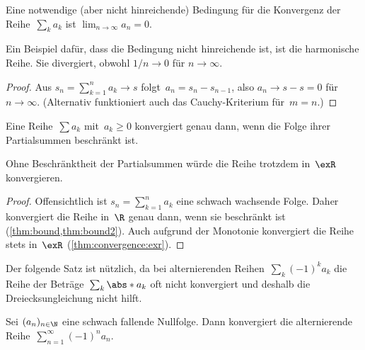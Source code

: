 \documentclass[a4paper]{article}
\begin{document}

\begin{theorem}\label{thm:series:zerosequence}
    Eine notwendige (aber nicht hinreichende) Bedingung für die Konvergenz der Reihe~$\sum_k a_k$ ist $\lim_{n\to\infty} a_n = 0$.
\end{theorem}

\begin{example}
    Ein Beispiel dafür, dass die Bedingung nicht hinreichende ist, ist die harmonische Reihe. Sie divergiert, obwohl $1/n \to 0$ für $n \to \infty$.
\end{example}

\begin{proof}
    Aus $s_n = \sum_{k=1}^n a_k \to s$ folgt~$a_n = s_n - s_{n-1}$, also $a_n \to s-s = 0$ für~$n \to \infty$. (Alternativ funktioniert auch das Cauchy-Kriterium für~$m = n$.)
\end{proof}

\begin{theorem}
    Eine Reihe~$\sum a_k$ mit~$a_k \geq 0$ konvergiert genau dann, wenn die Folge ihrer Partialsummen beschränkt ist.
\end{theorem}

\begin{remark}
    Ohne Beschränktheit der Partialsummen würde die Reihe trotzdem in~$\exR$ konvergieren.
\end{remark}

\begin{proof}
    Offensichtlich ist $s_n = \sum_{k=1}^n a_k$ eine schwach wachsende Folge. Daher konvergiert die Reihe in~$\R$ genau dann, wenn sie beschränkt ist (\cref{thm:bound,thm:bound2}). Auch aufgrund der Monotonie konvergiert die Reihe stets in~$\exR$ (\cref{thm:convergence:exr}).
\end{proof}

Der folgende Satz ist nützlich, da bei alternierenden Reihen~$\sum_k (-1)^k a_k$ die Reihe der Beträge~$\sum_k \abs*{a_k}$ oft nicht konvergiert und deshalb die Dreiecksungleichung nicht hilft.

\begin{theorem}\label{thm:series:leibniz}
    Sei $(a_n)_{n\in\N}$ eine schwach fallende Nullfolge. Dann konvergiert die alternierende Reihe~$\sum_{n=1}^\infty (-1)^n a_n$.
\end{theorem}
\end{document}
